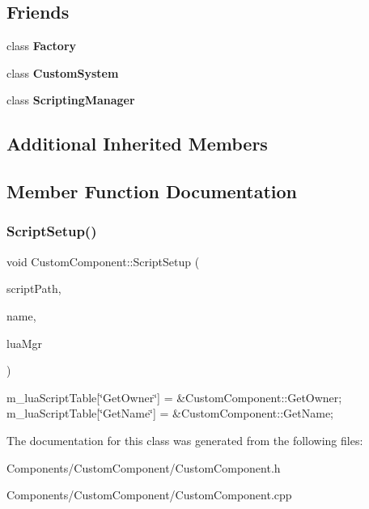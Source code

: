 \subsection*{Friends}
\begin{DoxyCompactItemize}
\item 
\mbox{\label{classCustomComponent_a328c093d609680cca505905c6d49901a}} 
class {\bfseries Factory}
\item 
\mbox{\label{classCustomComponent_ad53c39bc0891ebd13eca5e98a09ab765}} 
class {\bfseries Custom\+System}
\item 
\mbox{\label{classCustomComponent_ab3d6fafb2064bace492fd6b503d044f4}} 
class {\bfseries Scripting\+Manager}
\end{DoxyCompactItemize}
\subsection*{Additional Inherited Members}


\subsection{Member Function Documentation}
\mbox{\label{classCustomComponent_ac540fc607bb502790276815b55890c98}} 
\subsubsection{\texorpdfstring{Script\+Setup()}{ScriptSetup()}}
{\footnotesize\ttfamily void Custom\+Component\+::\+Script\+Setup (\begin{DoxyParamCaption}\item[{\hyperlink{classStringId}{String\+Id}}]{script\+Path,  }\item[{std\+::string const \&}]{name,  }\item[{\hyperlink{classScriptingManager}{Scripting\+Manager} $\ast$}]{lua\+Mgr }\end{DoxyParamCaption})}

m\+\_\+lua\+Script\+Table\mbox{[}\char`\"{}\+Get\+Owner\char`\"{}\mbox{]} = \&Custom\+Component\+::\+Get\+Owner; m\+\_\+lua\+Script\+Table\mbox{[}\char`\"{}\+Get\+Name\char`\"{}\mbox{]} = \&Custom\+Component\+::\+Get\+Name; 

The documentation for this class was generated from the following files\+:\begin{DoxyCompactItemize}
\item 
Components/\+Custom\+Component/Custom\+Component.\+h\item 
Components/\+Custom\+Component/Custom\+Component.\+cpp\end{DoxyCompactItemize}
